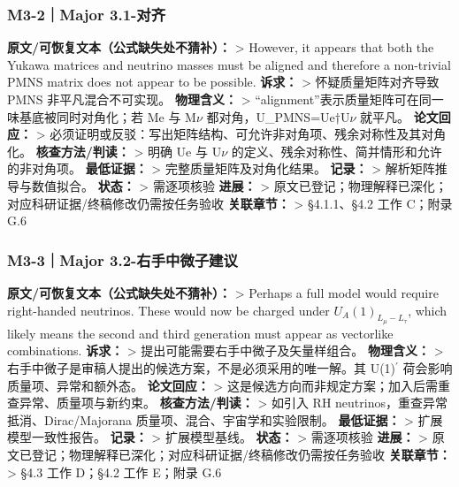 \documentclass[
  chinese,
  UTF8]{ctexart}
\begin{document}
\subsubsection{M3-2｜Major 3.1-对齐}\label{m3-2major-3.1-ux5bf9ux9f50}

\textbf{原文/可恢复文本（公式缺失处不猜补）：} \textgreater{} However,
it appears that both the Yukawa matrices and neutrino masses must be
aligned and therefore a non-trivial PMNS matrix does not appear to be
possible. \textbf{诉求：} \textgreater{} 怀疑质量矩阵对齐导致 PMNS
非平凡混合不可实现。 \textbf{物理含义：} \textgreater{}
``alignment''表示质量矩阵可在同一味基底被同时对角化；若 Me 与
M\ensuremath{\nu} 都对角，U\_PMNS=Ue†U\ensuremath{\nu} 就平凡。
\textbf{论文回应：} \textgreater{}
必须证明或反驳：写出矩阵结构、可允许非对角项、残余对称性及其对角化。
\textbf{核查方法/判读：} \textgreater{} 明确 Ue 与 U\ensuremath{\nu}
的定义、残余对称性、简并情形和允许的非对角项。 \textbf{最低证据：}
\textgreater{} 完整质量矩阵及对角化结果。 \textbf{记录：} \textgreater{}
解析矩阵推导与数值拟合。 \textbf{状态：} \textgreater{} 需逐项核验
\textbf{进展：} \textgreater{}
原文已登记；物理解释已深化；对应科研证据/终稿修改仍需按任务验收
\textbf{关联章节：} \textgreater{} §4.1.1、§4.2 工作 C；附录 G.6

\subsubsection{M3-3｜Major
3.2-右手中微子建议}\label{m3-3major-3.2-ux53f3ux624bux4e2dux5faeux5b50ux5efaux8bae}

\textbf{原文/可恢复文本（公式缺失处不猜补）：} \textgreater{} Perhaps a
full model would require right-handed neutrinos. These would now be
charged under \(U_A(1)_{L_{\mu}-L_{\tau}}\), which likely means the
second and third generation must appear as vectorlike combinations.
\textbf{诉求：} \textgreater{} 提出可能需要右手中微子及矢量样组合。
\textbf{物理含义：} \textgreater{}
右手中微子是审稿人提出的候选方案，不是必须采用的唯一解。其
U(1)\ensuremath{^\prime} 荷会影响质量项、异常和额外态。
\textbf{论文回应：} \textgreater{}
这是候选方向而非规定方案；加入后需重查异常、质量项与新约束。
\textbf{核查方法/判读：} \textgreater{} 如引入 RH
neutrinos，重查异常抵消、Dirac/Majorana 质量项、混合、宇宙学和实验限制。
\textbf{最低证据：} \textgreater{} 扩展模型一致性报告。 \textbf{记录：}
\textgreater{} 扩展模型基线。 \textbf{状态：} \textgreater{} 需逐项核验
\textbf{进展：} \textgreater{}
原文已登记；物理解释已深化；对应科研证据/终稿修改仍需按任务验收
\textbf{关联章节：} \textgreater{} §4.3 工作 D；§4.2 工作 E；附录 G.6
\end{document}
